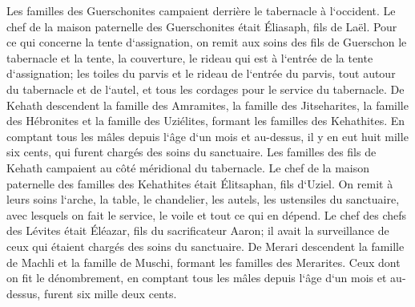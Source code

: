 \verse Les familles des Guerschonites campaient derrière le tabernacle à l`occident. 
\verse Le chef de la maison paternelle des Guerschonites était Éliasaph, fils de Laël. 
\verse Pour ce qui concerne la tente d`assignation, on remit aux soins des fils de Guerschon le tabernacle et la tente, la couverture, le rideau qui est à l`entrée de la tente d`assignation; 
\verse les toiles du parvis et le rideau de l`entrée du parvis, tout autour du tabernacle et de l`autel, et tous les cordages pour le service du tabernacle. 
\verse De Kehath descendent la famille des Amramites, la famille des Jitseharites, la famille des Hébronites et la famille des Uziélites, formant les familles des Kehathites. 
\verse En comptant tous les mâles depuis l`âge d`un mois et au-dessus, il y en eut huit mille six cents, qui furent chargés des soins du sanctuaire. 
\verse Les familles des fils de Kehath campaient au côté méridional du tabernacle. 
\verse Le chef de la maison paternelle des familles des Kehathites était Élitsaphan, fils d`Uziel. 
\verse On remit à leurs soins l`arche, la table, le chandelier, les autels, les ustensiles du sanctuaire, avec lesquels on fait le service, le voile et tout ce qui en dépend. 
\verse Le chef des chefs des Lévites était Éléazar, fils du sacrificateur Aaron; il avait la surveillance de ceux qui étaient chargés des soins du sanctuaire. 
\verse De Merari descendent la famille de Machli et la famille de Muschi, formant les familles des Merarites. 
\verse Ceux dont on fit le dénombrement, en comptant tous les mâles depuis l`âge d`un mois et au-dessus, furent six mille deux cents. 
